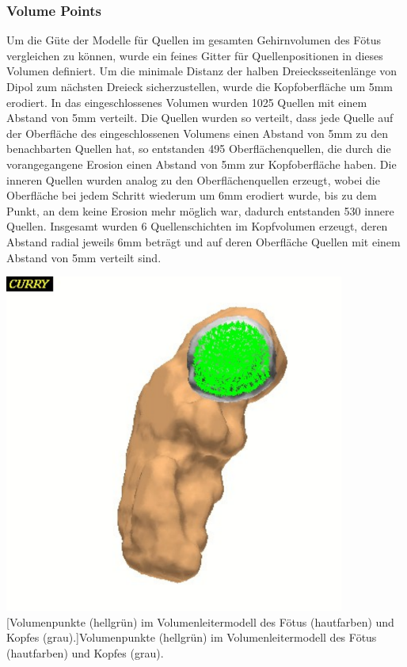 \subsubsection{Volume Points}
Um die Güte der Modelle für Quellen im gesamten Gehirnvolumen des Fötus
vergleichen zu können, wurde ein feines Gitter für Quellenpositionen in
dieses Volumen definiert. Um die minimale Distanz der halben
Dreiecksseitenlänge von Dipol zum nächsten Dreieck sicherzustellen,
wurde die Kopfoberfläche um 5mm erodiert. In das eingeschlossenes
Volumen wurden 1025 Quellen mit einem Abstand von 5mm verteilt. Die
Quellen wurden so verteilt, dass jede Quelle auf der Oberfläche des
eingeschlossenen Volumens einen Abstand von 5mm zu den benachbarten
Quellen hat, so entstanden 495 Oberflächenquellen, die durch die
vorangegangene Erosion einen Abstand von 5mm zur Kopfoberfläche haben.
Die inneren Quellen wurden analog zu den Oberflächenquellen erzeugt,
wobei die Oberfläche bei jedem Schritt wiederum um 6mm erodiert wurde,
bis zu dem Punkt, an dem keine Erosion mehr möglich war, dadurch
entstanden 530 innere Quellen. Insgesamt wurden 6 Quellenschichten im
Kopfvolumen erzeugt, deren Abstand radial jeweils 6mm beträgt und auf
deren Oberfläche Quellen mit einem Abstand von 5mm verteilt sind.



\begin{center}
\includegraphics[width=11.19cm,height=11.16cm]{BA-img/BA-img10.pdf}
[Volumenpunkte (hellgrün) im Volumenleitermodell des
Fötus (hautfarben) und Kopfes (grau).]{Volumenpunkte (hellgrün) im
Volumenleitermodell des Fötus (hautfarben) und Kopfes (grau).}

\end{center}

